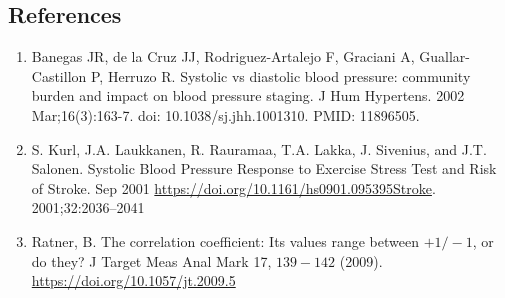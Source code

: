 \documentclass[
]{article}
\begin{document}
\hypertarget{references}{%
\subsection{References}\label{references}}

\begin{enumerate}
\def\labelenumi{\arabic{enumi}.}
\item
  Banegas JR, de la Cruz JJ, Rodriguez-Artalejo F, Graciani A,
  Guallar-Castillon P, Herruzo R. Systolic vs diastolic blood pressure:
  community burden and impact on blood pressure staging. J Hum
  Hypertens. 2002 Mar;16(3):163-7. doi: 10.1038/sj.jhh.1001310. PMID:
  11896505.
\item
  S. Kurl, J.A. Laukkanen, R. Rauramaa, T.A. Lakka, J. Sivenius, and
  J.T. Salonen. Systolic Blood Pressure Response to Exercise Stress Test
  and Risk of Stroke. Sep 2001
  \url{https://doi.org/10.1161/hs0901.095395Stroke}. 2001;32:2036--2041
\item
  Ratner, B. The correlation coefficient: Its values range between
  \(+1/-1\), or do they? J Target Meas Anal Mark 17, \(139-142\) (2009).
  \url{https://doi.org/10.1057/jt.2009.5}
\end{enumerate}
\end{document}
